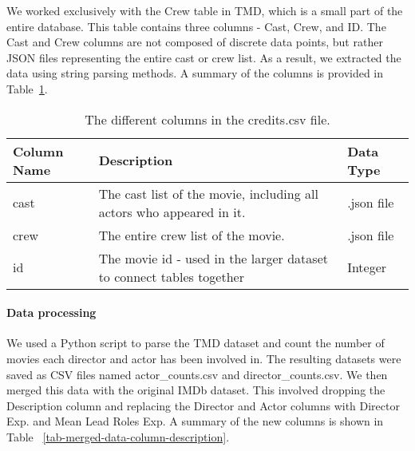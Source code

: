     \begin{multicols}{2}

        We worked exclusively with the Crew table in TMD, which is a small part of the
            entire database.
        This table contains three columns - Cast, Crew, and ID.
        The Cast and Crew columns are not composed of discrete data points, but rather
            JSON files representing the entire cast or crew list.
        As a result, we extracted the data using string parsing methods.
        A summary of the columns is provided in
            Table~\ref{tab-Credits-Column-Description}.

    \end{multicols}
    \begin{table}[h]
        \centering
        \begin{tabular}{lp{10cm}l}
            \toprule
            Column Name & Description                                                          & Data Type  \\
            \midrule
            cast        & The cast list of the movie, including all actors who appeared in it. & .json file \\
            crew        & The entire crew list of the movie.                                   & .json file \\
            id          & The movie id - used in the larger dataset to connect tables together & Integer    \\
            \bottomrule
        \end{tabular}
        \caption[short]{The different columns in the credits.csv file.}\label{tab-Credits-Column-Description}
    \end{table}
    \begin{multicols}{2}

        \paragraph{Data processing}
            We used a Python script to parse the TMD dataset and count the number of movies
                each director and actor has been involved in.
            The resulting datasets were saved as CSV files named actor\_counts.csv and
                director\_counts.csv.
            We then merged this data with the original IMDb dataset.
            This involved dropping the Description column and replacing the Director and
                Actor columns with Director Exp.
            and Mean Lead Roles Exp.
            A summary of the new columns is shown in Table
                ~\ref{tab-merged-data-column-description}.
    \end{multicols}
